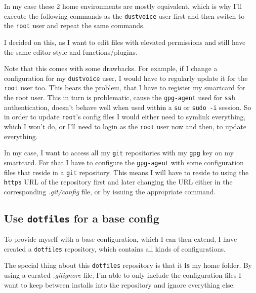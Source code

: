 \documentclass[10pt]{dustdoc}
\begin{document}
\begin{NOTE}
    In my case these 2 home environments are mostly equivalent, which is why I’ll execute the following commands as the \texttt{dustvoice} user first and then switch to the \texttt{root} user and repeat the same commands.

    I decided on this, as I want to edit files with elevated permissions and still have the same editor style and functions/plugins.

    Note that this comes with some drawbacks.
    For example, if I change a configuration for my \texttt{dustvoice} user, I would have to regularly update it for the \texttt{root} user too.
    This bears the problem, that I have to register my smartcard for the root user.
    This in turn is problematic, cause the \texttt{gpg-agent} used for \texttt{ssh} authentication, doesn’t behave well when used within a \texttt{su} or \texttt{sudo -i} session.
    So in order to update \texttt{root}'s config files I would either need to symlink everything, which I won’t do, or I’ll need to login as the \texttt{root} user now and then, to update everything.
\end{NOTE}

\begin{NOTE}
    In my case, I want to access all my \texttt{git} repositories with my \texttt{gpg} key on my smartcard.
    For that I have to configure the \texttt{gpg-agent} with some configuration files that reside in a \texttt{git} repository.
    This means I will have to reside to using the \texttt{https} URL of the repository first and later changing the URL either in the corresponding \textit{.git/config} file, or by issuing the appropriate command.
\end{NOTE}

\subsection{Use \texttt{dotfiles} for a base config}
\label{sec:use-dotfiles-for-a-base-config}

To provide myself with a base configuration, which I can then extend, I have created a \texttt{dotfiles} repository, which contains all kinds of configurations.

The special thing about this \texttt{dotfiles} repository is that it \textbf{is} my home folder.
By using a curated \textit{.gitignore} file, I’m able to only include the configuration files I want to keep between installs into the repository and ignore everything else.
\end{document}
